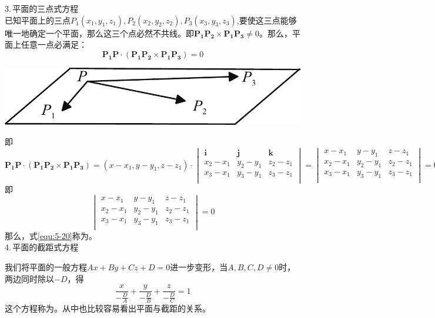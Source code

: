 \noindent
\begin{minipage}{0.6\linewidth}
3.$\,$平面的三点式方程\\
\hspace*{2em}已知平面上的三点$P_1(x_1,y_1,z_1),P_2(x_2,y_2,z_2),P_3(x_3,y_3,z_3)$,要使这三点能够唯一地确定一个平面，那么这三个点必然不共线。即$\boldsymbol{P_1P_2}\times\boldsymbol{P_1P_3}\neq 0$。那么，平面上任意一点必满足：
\begin{equation}
	\boldsymbol{P_1P}\cdot(\boldsymbol{P_1P_2}\times\boldsymbol{P_1P_3})=0
\end{equation}
\end{minipage}
\begin{minipage}{0.4\linewidth}
	\centering
	\includegraphics[width = 0.85\linewidth]{pic/C-5/plane2}
	\vspace*{-1em}
	\label{平面的三点式方程}
\end{minipage}

\noindent 即\begin{equation}
	\boldsymbol{P_1P}\cdot(\boldsymbol{P_1P_2}\times\boldsymbol{P_1P_3})=(x-x_1,y-y_1,z-z_1)\cdot
	\begin{vmatrix}
		\boldsymbol{i} & \boldsymbol{j} & \boldsymbol{k}\\
		x_2-x_1 & y_2-y_1 & z_2-z_1\\
		x_3-x_1 & y_3-y_1 & z_3-z_1\\
	\end{vmatrix}=
\begin{vmatrix}
	x-x_1 & y-y_1 & z-z_1\\
	x_2-x_1 & y_2-y_1 & z_2-z_1\\
	x_3-x_1 & y_3-y_1 & z_3-z_1\\
\end{vmatrix}=0
\end{equation}
即\begin{equation}
	\begin{vmatrix}
		x-x_1 & y-y_1 & z-z_1\\
		x_2-x_1 & y_2-y_1 & z_2-z_1\\
		x_3-x_1 & y_3-y_1 & z_3-z_1\\
	\end{vmatrix}=0
\label{equ:5-20}
\end{equation}
那么，式\eqref{equ:5-20}称为。\\
4.$\,$平面的截距式方程
\par 我们将平面的一般方程$Ax+By+Cz+D=0$进一步变形，当$A,B,C,D\neq0$时，两边同时除以$-D$，得
\begin{equation}
	\displaystyle \frac{x}{-\frac{D}{A}}+\frac{y}{-\frac{D}{B}}+\frac{z}{-\frac{D}{C}}
=1\end{equation}
这个方程称为。从中也比较容易看出平面与截距的关系。\\

